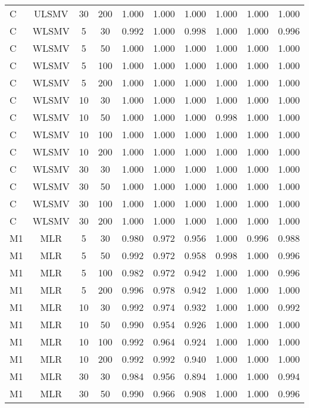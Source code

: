 {\begin{longtable}[!tbp]{@{\extracolsep{\fill}}lccccccccc}
  C & ULSMV & 30 & 200 & 1.000 & 1.000 & 1.000 & 1.000 & 1.000 & 1.000 \\ 
  C & WLSMV & 5 & 30 & 0.992 & 1.000 & 0.998 & 1.000 & 1.000 & 0.996 \\ 
  C & WLSMV & 5 & 50 & 1.000 & 1.000 & 1.000 & 1.000 & 1.000 & 1.000 \\ 
  C & WLSMV & 5 & 100 & 1.000 & 1.000 & 1.000 & 1.000 & 1.000 & 1.000 \\ 
  C & WLSMV & 5 & 200 & 1.000 & 1.000 & 1.000 & 1.000 & 1.000 & 1.000 \\ 
  C & WLSMV & 10 & 30 & 1.000 & 1.000 & 1.000 & 1.000 & 1.000 & 1.000 \\ 
  C & WLSMV & 10 & 50 & 1.000 & 1.000 & 1.000 & 0.998 & 1.000 & 1.000 \\ 
  C & WLSMV & 10 & 100 & 1.000 & 1.000 & 1.000 & 1.000 & 1.000 & 1.000 \\ 
  C & WLSMV & 10 & 200 & 1.000 & 1.000 & 1.000 & 1.000 & 1.000 & 1.000 \\ 
  C & WLSMV & 30 & 30 & 1.000 & 1.000 & 1.000 & 1.000 & 1.000 & 1.000 \\ 
  C & WLSMV & 30 & 50 & 1.000 & 1.000 & 1.000 & 1.000 & 1.000 & 1.000 \\ 
  C & WLSMV & 30 & 100 & 1.000 & 1.000 & 1.000 & 1.000 & 1.000 & 1.000 \\ 
  C & WLSMV & 30 & 200 & 1.000 & 1.000 & 1.000 & 1.000 & 1.000 & 1.000 \\ 
  M1 & MLR & 5 & 30 & 0.980 & 0.972 & 0.956 & 1.000 & 0.996 & 0.988 \\ 
  M1 & MLR & 5 & 50 & 0.992 & 0.972 & 0.958 & 0.998 & 1.000 & 0.996 \\ 
  M1 & MLR & 5 & 100 & 0.982 & 0.972 & 0.942 & 1.000 & 1.000 & 0.996 \\ 
  M1 & MLR & 5 & 200 & 0.996 & 0.978 & 0.942 & 1.000 & 1.000 & 1.000 \\ 
  M1 & MLR & 10 & 30 & 0.992 & 0.974 & 0.932 & 1.000 & 1.000 & 0.992 \\ 
  M1 & MLR & 10 & 50 & 0.990 & 0.954 & 0.926 & 1.000 & 1.000 & 1.000 \\ 
  M1 & MLR & 10 & 100 & 0.992 & 0.964 & 0.924 & 1.000 & 1.000 & 1.000 \\ 
  M1 & MLR & 10 & 200 & 0.992 & 0.992 & 0.940 & 1.000 & 1.000 & 1.000 \\ 
  M1 & MLR & 30 & 30 & 0.984 & 0.956 & 0.894 & 1.000 & 1.000 & 0.994 \\ 
  M1 & MLR & 30 & 50 & 0.990 & 0.966 & 0.908 & 1.000 & 1.000 & 0.996 \\ 

\end{longtable}}

